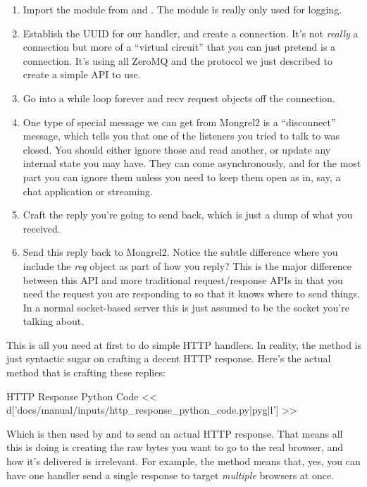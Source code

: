 \begin{enumerate}
\item Import the  module from  and .  The  module is
    really only used for logging.
\item Establish the UUID for our handler, and create a connection.  It's not \emph{really} a connection
    but more of a ``virtual circuit'' that you can just pretend is a connection.  It's using all ZeroMQ and
    the protocol we just described to create a simple API to use.
\item Go into a while loop forever and recv request objects off the connection.
\item One type of special message we can get from Mongrel2 is a ``disconnect'' message, which tells you that
    one of the listeners you tried to talk to was closed.  You should either ignore those and read
    another, or update any internal state you may have.  They can come asynchronously, and for the most
    part you can ignore them unless you need to keep them open as in, say, a chat application or streaming.
\item Craft the reply you're going to send back, which is just a dump of what you received.
\item Send this reply back to Mongrel2.  Notice the subtle difference where you include the \emph{req} object
    as part of how you reply?  This is the major difference between this API and more traditional
    request/response APIs in that you need the request you are responding to so that it knows where to send
    things.  In a normal socket-based server this is just assumed to be the socket you're talking about.
\end{enumerate}

This is all you need at first to do simple HTTP handlers.  In reality, the  method is
just syntactic sugar on crafting a decent HTTP response.  Here's the actual method that is crafting these replies:

\begin{code}{HTTP Response Python Code}
<< d['docs/manual/inputs/http_response_python_code.py|pyg|l'] >>
\end{code}

Which is then used by  and
 to send an actual HTTP response.  That
means all this is doing is creating the raw bytes you want to go
to the real browser, and how it's delivered is irrelevant.  For example,
the  method means that, yes, you can have one
handler send a single response to target \emph{multiple} browsers
at once.


